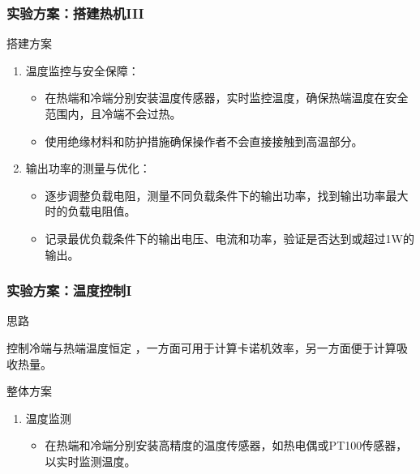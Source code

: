 \documentclass[aspectratio=169]{beamer}
\newcounter{currentenumi}
\begin{document}
	\begin{frame}	
		\frametitle{实验方案：搭建热机III}	
		
		\begin{block}{搭建方案}
			\begin{enumerate}
				
				\setcounter{enumi}{\thecurrentenumi}			
				
				\item 温度监控与安全保障：
				\begin{itemize}
					\item 在热端和冷端分别安装温度传感器，实时监控温度，确保热端温度在安全范围内，且冷端不会过热。
					\item 使用绝缘材料和防护措施确保操作者不会直接接触到高温部分。
				\end{itemize}
				
				\item 输出功率的测量与优化：
				\begin{itemize}
					\item 逐步调整负载电阻，测量不同负载条件下的输出功率，找到输出功率最大时的负载电阻值。
					\item 记录最优负载条件下的输出电压、电流和功率，验证是否达到或超过1W的输出。
				\end{itemize}
			\end{enumerate}
		\end{block}
		
	\end{frame}
	
	\begin{frame}
		\frametitle{实验方案：温度控制I}
		
		\begin{block}{思路}
			\begin{myhighlight}
				控制冷端与热端温度恒定 ，一方面可用于计算卡诺机效率，另一方面便于计算吸收热量。
			\end{myhighlight}
		\end{block}
		
		\begin{block}{整体方案}
			\begin{enumerate}
				\item 温度监测
				\begin{itemize}
					\item 在热端和冷端分别安装高精度的温度传感器，如热电偶或PT100传感器，以实时监测温度。
				\end{itemize}
				
				\setcounter{currentenumi}{\theenumi}
				
			\end{enumerate}
		\end{block}
	\end{frame}
	
\end{document}
